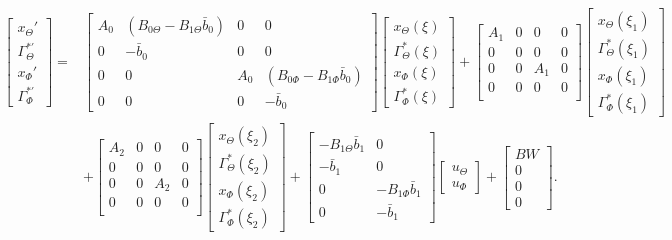 \documentclass[../main.tex]{subfiles}
\begin{document}
\begin{align}
\begin{bmatrix}
x_\Theta' \\
\Gamma_\Theta^{*'} \\
x_\Phi' \\
\Gamma_\Phi^{*'} 
\end{bmatrix} =&
\begin{bmatrix}
A_0 & (B_{0\Theta} - B_{1\Theta} \bar{b}_0) & 0 & 0\\
0 & -\bar{b}_0 & 0 & 0 \\
0 & 0 & A_0 & (B_{0\Phi} - B_{1\Phi} \bar{b}_0)\\
0 & 0 & 0 & -\bar{b}_0
\end{bmatrix}
\begin{bmatrix}
x_\Theta(\xi) \\
\Gamma_\Theta^{*}(\xi) \\
x_\Phi(\xi) \\
\Gamma_\Phi^{*} (\xi)
\end{bmatrix} + 
\begin{bmatrix}
A_1 & 0 & 0 & 0\\
0 & 0 & 0 & 0 \\
0 & 0 & A_1 & 0 \\
0 & 0 & 0 & 0 \\
\end{bmatrix}
\begin{bmatrix}
x_\Theta(\xi_1) \\
\Gamma_\Theta^{*}(\xi_1) \\
x_\Phi(\xi_1) \\
\Gamma_\Phi^{*} (\xi_1)
\end{bmatrix} \nonumber\\ 
&+\begin{bmatrix}
A_2 & 0 & 0 & 0 \\
0 & 0 & 0 & 0 \\
0 & 0 & A_2 & 0 \\
0 & 0 & 0 & 0 \\
\end{bmatrix}
\begin{bmatrix}
x_\Theta(\xi_2) \\
\Gamma_\Theta^{*}(\xi_2) \\
x_\Phi(\xi_2) \\
\Gamma_\Phi^{*} (\xi_2)
\end{bmatrix} +
\begin{bmatrix}
-B_{1\Theta}\bar{b}_1 & 0 \\
-\bar{b}_1 & 0 \\
0 & -B_{1\Phi}\bar{b}_1 \\
0 & -\bar{b}_1
\end{bmatrix}
\begin{bmatrix}
u_\Theta \\
u_\Phi
\end{bmatrix} +
\begin{bmatrix}
BW \\
0 \\
0 \\
0
\end{bmatrix}.
\end{align}
\end{document}
